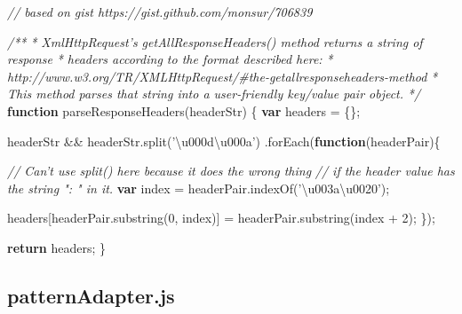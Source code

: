 \documentclass[12pt, ]{article}
\newenvironment{Shaded}{}{}
\newcommand{\KeywordTok}[1]{\textcolor[rgb]{0.00,0.44,0.13}{\textbf{{#1}}}}
\newcommand{\DecValTok}[1]{\textcolor[rgb]{0.25,0.63,0.44}{{#1}}}
\newcommand{\StringTok}[1]{\textcolor[rgb]{0.25,0.44,0.63}{{#1}}}
\newcommand{\CommentTok}[1]{\textcolor[rgb]{0.38,0.63,0.69}{\textit{{#1}}}}
\newcommand{\OtherTok}[1]{\textcolor[rgb]{0.00,0.44,0.13}{{#1}}}
\newcommand{\FunctionTok}[1]{\textcolor[rgb]{0.02,0.16,0.49}{{#1}}}
\newcommand{\NormalTok}[1]{{#1}}
\begin{document}
\begin{Shaded}
\begin{Highlighting}[]
\CommentTok{// based on gist https://gist.github.com/monsur/706839}

\CommentTok{/**}
\CommentTok{ * XmlHttpRequest's getAllResponseHeaders() method returns a string of response}
\CommentTok{ * headers according to the format described here:}
\CommentTok{ * http://www.w3.org/TR/XMLHttpRequest/#the-getallresponseheaders-method}
\CommentTok{ * This method parses that string into a user-friendly key/value pair object.}
\CommentTok{ */}
\KeywordTok{function} \FunctionTok{parseResponseHeaders}\NormalTok{(headerStr) \{}
   \KeywordTok{var} \NormalTok{headers = \{\};}
   
   \NormalTok{headerStr && }\OtherTok{headerStr}\NormalTok{.}\FunctionTok{split}\NormalTok{(}\StringTok{'\textbackslash{}u000d\textbackslash{}u000a'}\NormalTok{)}
      \NormalTok{.}\FunctionTok{forEach}\NormalTok{(}\KeywordTok{function}\NormalTok{(headerPair)\{}
   
         \CommentTok{// Can't use split() here because it does the wrong thing}
         \CommentTok{// if the header value has the string ": " in it.}
         \KeywordTok{var} \NormalTok{index = }\OtherTok{headerPair}\NormalTok{.}\FunctionTok{indexOf}\NormalTok{(}\StringTok{'\textbackslash{}u003a\textbackslash{}u0020'}\NormalTok{);}
         
         \NormalTok{headers[}\OtherTok{headerPair}\NormalTok{.}\FunctionTok{substring}\NormalTok{(}\DecValTok{0}\NormalTok{, index)] }
                     \NormalTok{= }\OtherTok{headerPair}\NormalTok{.}\FunctionTok{substring}\NormalTok{(index + }\DecValTok{2}\NormalTok{);}
      \NormalTok{\});}
   
   \KeywordTok{return} \NormalTok{headers;}
\NormalTok{\}}
\end{Highlighting}
\end{Shaded}

\pagebreak

\subsection{patternAdapter.js}\label{headerux5fpatternAdapter}

\label{src_patternAdapter}
\end{document}
